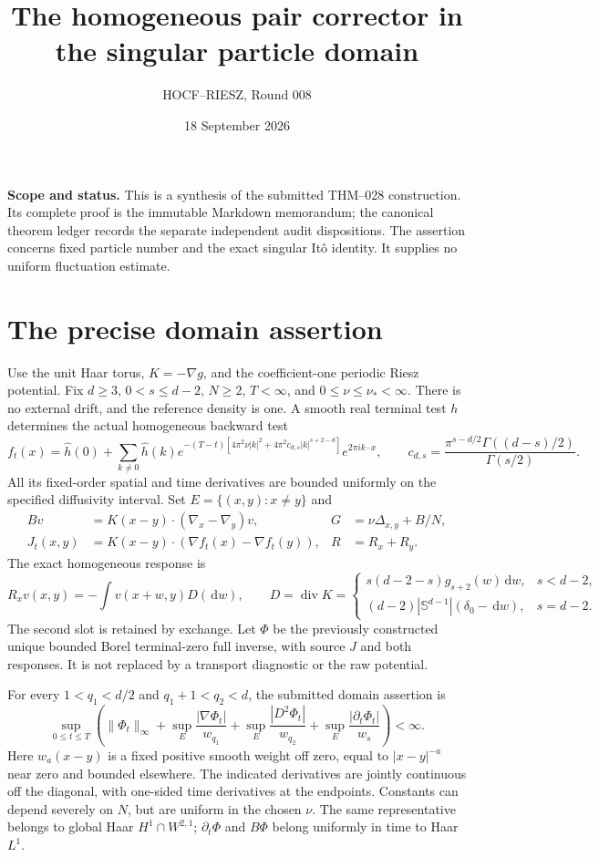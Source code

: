 \documentclass[10pt]{article}
\title{The homogeneous pair corrector in the singular particle domain}
\author{HOCF--RIESZ, Round 008}
\date{18 September 2026}
\newcommand{\dd}{\,\mathrm d}
\begin{document}
\maketitle
\noindent\textbf{Scope and status.} This is a synthesis of the submitted THM--028
construction. Its complete proof is the immutable Markdown memorandum; the
canonical theorem ledger records the separate independent audit dispositions.
The assertion concerns fixed particle number and the exact singular It\^o
identity. It supplies no uniform fluctuation estimate.

\section*{The precise domain assertion}
Use the unit Haar torus, $K=-\nabla g$, and the coefficient-one periodic Riesz
potential. Fix $d\ge3$, $0<s\le d-2$, $N\ge2$, $T<\infty$, and
$0\le\nu\le\nu_*<\infty$. There is no external drift, and the reference density
is one. A smooth real terminal test $h$ determines the actual homogeneous
backward test
\[
 f_t(x)=\widehat h(0)+\sum_{k\ne0}\widehat h(k)
 e^{-(T-t)[4\pi^2\nu|k|^2+4\pi^2c_{d,s}|k|^{s+2-d}]}
 e^{2\pi i k\cdot x},\qquad
 c_{d,s}=\frac{\pi^{s-d/2}\Gamma((d-s)/2)}{\Gamma(s/2)}.
\]
All its fixed-order spatial and time derivatives are bounded uniformly on the
specified diffusivity interval. Set $E=\{(x,y):x\ne y\}$ and
\begin{align*}
 Bv&=K(x-y)\cdot(\nabla_x-\nabla_y)v,&G&=\nu\Delta_{x,y}+B/N,\\
 J_t(x,y)&=K(x-y)\cdot(\nabla f_t(x)-\nabla f_t(y)),&R&=R_x+R_y.
\end{align*}
The exact homogeneous response is
\[
 R_xv(x,y)=-\int v(x+w,y)D(\dd w),\qquad
 D=\operatorname{div}K=
 \begin{cases}
 s(d-2-s)g_{s+2}(w)\dd w,&s<d-2,\\
 (d-2)|\mathbb S^{d-1}|(\delta_0-\dd w),&s=d-2.
 \end{cases}
\]
The second slot is retained by exchange. Let $\Phi$ be the previously constructed
unique bounded Borel terminal-zero full inverse, with source $J$ and both
responses. It is not replaced by a transport diagnostic or the raw potential.

For every $1<q_1<d/2$ and $q_1+1<q_2<d$, the submitted domain assertion is
\[
 \sup_{0\le t\le T}\left(\|\Phi_t\|_\infty+
 \sup_E\frac{|\nabla\Phi_t|}{w_{q_1}}+
 \sup_E\frac{|D^2\Phi_t|}{w_{q_2}}+
 \sup_E\frac{|\partial_t\Phi_t|}{w_s}\right)<\infty.
\]
Here $w_a(x-y)$ is a fixed positive smooth weight off zero, equal to
$|x-y|^{-a}$ near zero and bounded elsewhere. The indicated derivatives are
jointly continuous off the diagonal, with one-sided time derivatives at the
endpoints. Constants can depend severely on $N$, but are uniform in the chosen
$\nu$. The same representative belongs to global Haar $H^1\cap W^{2,1}$;
$\partial_t\Phi$ and $B\Phi$ belong uniformly in time to Haar $L^1$.
\end{document}
